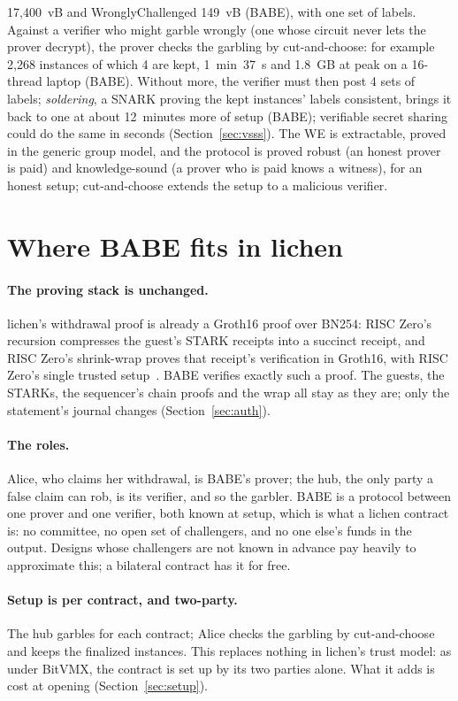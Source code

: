 \documentclass[11pt]{article}
\begin{document}
17,400~vB and WronglyChallenged 149~vB (BABE), with one set of labels.
Against a verifier who might garble wrongly (one whose circuit never lets
the prover decrypt), the prover checks the garbling by cut-and-choose:
for example 2,268 instances of which 4 are kept, 1~min~37~s and 1.8~GB at
peak on a 16-thread laptop (BABE). Without more, the verifier must then
post 4 sets of labels; \emph{soldering}, a SNARK proving the kept
instances' labels consistent, brings it back to one at about 12~minutes
more of setup (BABE); verifiable secret sharing could do the same in
seconds (Section~\ref{sec:vsss}). The WE is extractable, proved in the generic group
model, and the protocol is proved robust (an honest prover is paid) and
knowledge-sound (a prover who is paid knows a witness), for an honest
setup; cut-and-choose extends the setup to a malicious verifier.

\section{Where BABE fits in lichen}
\label{sec:fit}

\paragraph{The proving stack is unchanged.} lichen's withdrawal proof is
already a Groth16 proof over BN254: RISC Zero's recursion compresses the
guest's STARK receipts into a succinct receipt, and RISC Zero's
shrink-wrap proves that receipt's verification in Groth16, with RISC
Zero's single trusted setup~\cite{risc0}. BABE verifies exactly such a
proof. The guests, the STARKs, the sequencer's chain proofs and the
wrap all stay as they are; only the statement's journal changes
(Section~\ref{sec:auth}).

\paragraph{The roles.} Alice, who claims her withdrawal, is BABE's
prover; the hub, the only party a false claim can rob, is its verifier,
and so the garbler. BABE is a protocol between one prover and one
verifier, both known at setup, which is what a lichen contract is: no
committee, no open set of challengers, and no one else's funds in the
output. Designs whose challengers are not known in advance pay heavily
to approximate this; a bilateral contract has it for free.

\paragraph{Setup is per contract, and two-party.} The hub garbles for
each contract; Alice checks the garbling by cut-and-choose and keeps the
finalized instances. This replaces nothing in lichen's trust model: as
under BitVMX, the contract is set up by its two parties alone. What it
adds is cost at opening (Section~\ref{sec:setup}).
\end{document}
